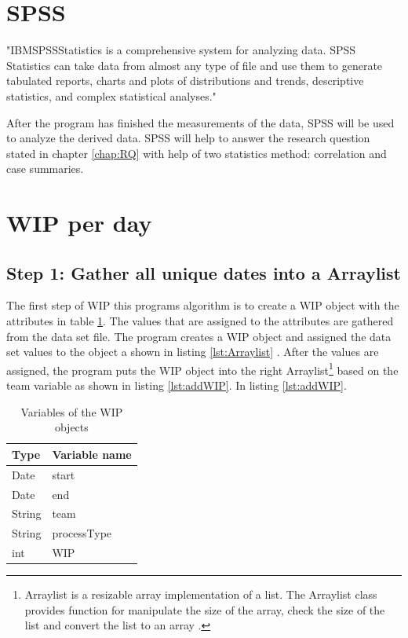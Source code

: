 \documentclass[UKenglish]{ifimaster}  %
\begin{document}
\section{SPSS}
\label{sec:SPSS}
"IBM\circledR  SPSS\circledR Statistics is a comprehensive system for analyzing data. SPSS Statistics can take data from almost any type of file and use them to generate tabulated reports, charts and plots of distributions and trends, descriptive statistics, and complex statistical analyses." \parencite{IBM}

After the program has finished the measurements of the data, SPSS will be used to analyze the derived data. SPSS will help to answer the research question stated in chapter \ref{chap:RQ} with help of two statistics method: correlation and case summaries. 


\section {WIP per day}
\label{WPD}


\subsection{Step 1: Gather all unique dates into a Arraylist}
\label{sub:stepOne}
The first step of WIP this programs algorithm is to create a WIP object with the attributes in table \ref{tab:object}.  The values that are assigned to the attributes are gathered from the data set file.  The program creates a WIP object and assigned the data set values to the object a shown in listing \ref{lst:Arraylist} . After the values are assigned, the program puts the WIP object into the right Arraylist\footnote{Arraylist is a resizable array implementation of a list. The Arraylist class provides function for manipulate the size of the array, check the size of the list and convert the list to an array  \parencite{Arraylist}.} based on the team variable as shown in listing \ref{lst:addWIP}. In listing \ref{lst:addWIP}.
\begin{table}[!ht]
\begin{center}
\begin{tabular}{| l | l |}
\hline
\bf{Type} & \bf{Variable name} \\ \hline
Date & start \\ \hline
Date & end\\ \hline
String & team\\ \hline
String & processType\\ \hline
int  & WIP\\ \hline
\end{tabular}
\caption{Variables of the WIP objects}
\label{tab:object}
\end{center}
\end{table}
\end{document}
